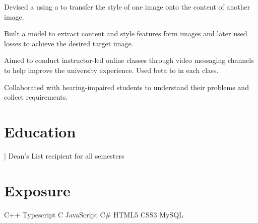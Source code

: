 \documentclass[]{rinkal_resume}
\begin{document}
 
\vspace{2pt}
\begin{tightemize}
\item Devised a  using a  to transfer the style of one image onto the content of another image.
\item Built a model to extract content and style features form images and later used losses to achieve the desired target image.
\end{tightemize}
\sectionsep

 
\vspace{2pt}
\begin{tightemize}
\item Aimed to conduct instructor-led online classes  through video messaging channels to help improve the university experience. Used beta to  in each class.
\item Collaborated with hearing-impaired students to understand their problems and collect requirements.
\end{tightemize}


\section{Education} 
 
\small {} | Dean's List recipient for all semesters


\section{Exposure}
 \textbullet{} 
 \textbullet{} 
 \textbullet{} 
C++ \textbullet{} 
Typescript \textbullet{} 
C \textbullet{} 
JavaScript \textbullet{} 
C\# \textbullet{} 
HTML5 \textbullet{} 
CSS3 \textbullet{} 
MySQL 
\end{document}
